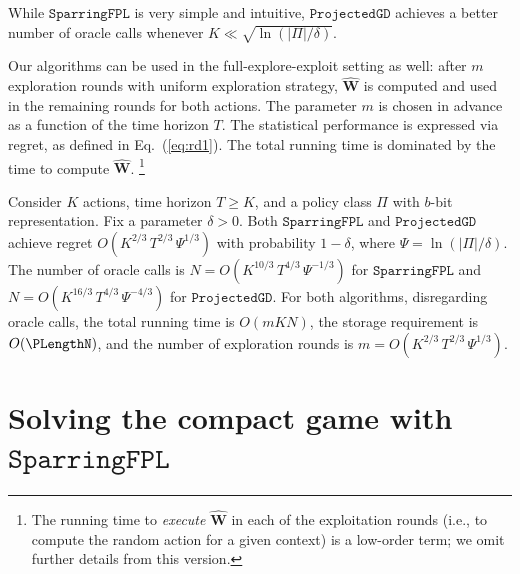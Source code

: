 While \ensuremath{\mathtt{SparringFPL}} is very simple and intuitive, \ensuremath{\mathtt{ProjectedGD}} achieves a better number of oracle calls whenever $K \ll \sqrt{\ln({|\Pi|}/\delta)}$.

Our algorithms can be used in the full-explore-exploit setting as well: after $m$ exploration rounds with uniform exploration strategy, $\mathbf{\hat{W}}$ is computed and used in the remaining rounds for both actions. The parameter $m$ is chosen in advance as a function of the time horizon $T$. The statistical performance is expressed via regret, as defined in Eq.~(\ref{eq:rd1}). The total running time is dominated by the time to compute $\mathbf{\hat{W}}$.
\footnote{The running time to \emph{execute} $\mathbf{\hat{W}}$ in each of the exploitation rounds (i.e., to compute the random action for a given context) is a low-order term; we omit further details from this version.}

\begin{theorem}[regret]\label{thm:main-regret}
Consider $K$ actions, time horizon $T\geq K$, and a policy class $\Pi$ with $b$-bit representation. Fix a parameter $\delta>0$. Both \ensuremath{\mathtt{SparringFPL}} and \ensuremath{\mathtt{ProjectedGD}} achieve regret
    $O(K^{2/3}\, T^{2/3}\, \Psi^{1/3})$     
with probability $1-\delta$, where
    $\Psi = \ln({|\Pi|}/\delta)$.
The number of oracle calls is $N = O(K^{10/3}\, T^{4/3}\,\Psi^{-1/3})$   
for \ensuremath{\mathtt{SparringFPL}} and $N = O(K^{16/3}\, T^{4/3}\,\Psi^{-4/3})$   
for \ensuremath{\mathtt{ProjectedGD}}.
For both algorithms, disregarding oracle calls, the total running time is $O(m KN)$, the storage requirement is $O(\PLengthN)$, and the number of exploration rounds is $m = O(K^{2/3}\, T^{2/3}\,\Psi^{1/3})$.
\end{theorem}

\section{Solving the compact game with \ensuremath{\mathtt{SparringFPL}}}
\label{sec:FPL}

